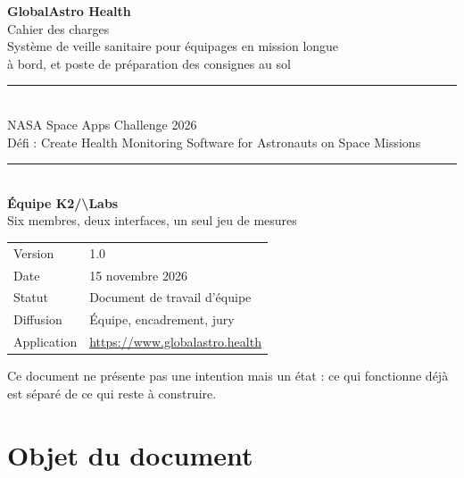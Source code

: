 \documentclass[11pt,a4paper]{article}
\let\sectionorig\section
\renewcommand{\section}{\Needspace{5\baselineskip}\sectionorig}
\newcommand{\kl}{K2/\textbackslash{}Labs}
\begin{document}
\begin{titlepage}
\thispagestyle{empty}
\centering
\vspace*{2.2cm}

{\Huge\bfseries GlobalAstro Health}\\[0.5cm]
{\Large Cahier des charges}\\[0.2cm]
{\large Syst\`eme de veille sanitaire pour \'equipages en mission longue\\}
{\large \`a bord, et poste de pr\'eparation des consignes au sol}\\[1.6cm]

\rule{0.72\textwidth}{0.6pt}\\[0.45cm]
{\large NASA Space Apps Challenge 2026}\\[0.15cm]
{\normalsize D\'efi : Create Health Monitoring Software for Astronauts on Space Missions}\\[0.45cm]
\rule{0.72\textwidth}{0.6pt}\\[1.6cm]

{\large\bfseries \'Equipe \kl}\\[0.25cm]
{\normalsize Six membres, deux interfaces, un seul jeu de mesures}\\[2.2cm]

\begin{tabular}{@{}ll@{}}
\small Version & \small 1.0 \\[2pt]
\small Date & \small 15 novembre 2026 \\[2pt]
\small Statut & \small Document de travail d'\'equipe \\[2pt]
\small Diffusion & \small \'Equipe, encadrement, jury \\[2pt]
\small Application & \small \url{https://www.globalastro.health} \\
\end{tabular}

\vfill
{\footnotesize Ce document ne pr\'esente pas une intention mais un \'etat : ce qui fonctionne d\'ej\`a est s\'epar\'e de ce qui reste \`a construire.}
\end{titlepage}

\tableofcontents
\newpage

\section{Objet du document}
\end{document}
